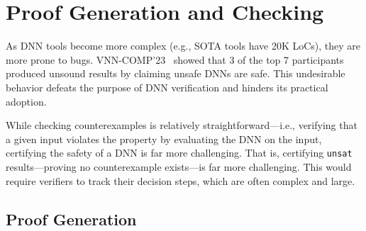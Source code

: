 \documentclass[oneside,11pt,dvipsnames]{book}
\numberwithin{equation}{section}
\theoremstyle{definition}
\theoremstyle{remark}
\begin{document}
\chapter{Proof Generation and Checking}\label{chapter:proof-gen-check}

As DNN tools become more complex (e.g., SOTA tools have 20K LoCs), they are more prone to bugs. VNN-COMP'23~\cite{brix2023fourth} showed that 3 of the top 7 participants produced unsound results by claiming unsafe DNNs are safe. This undesirable behavior defeats the purpose of DNN verification and hinders its practical adoption.

While checking counterexamples is relatively straightforward---i.e., verifying that a given input violates the property by evaluating the DNN on the input, certifying the safety of a DNN is far more challenging. That is, certifying \texttt{unsat} results---proving no counterexample exists---is far more challenging. This would require verifiers to track their decision steps, which are often complex and large. %

\section{Proof Generation}\label{sec:proofgen}

\end{document}

